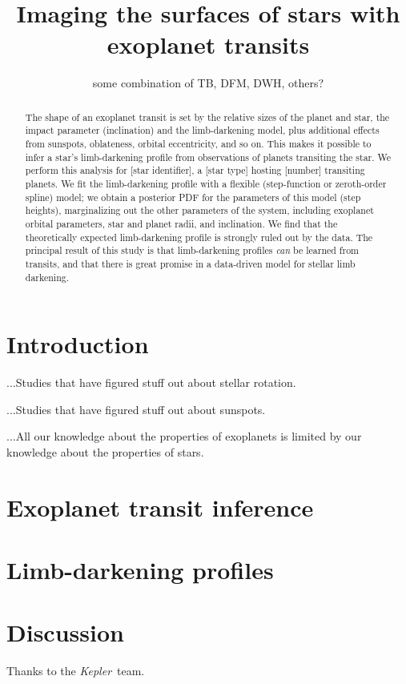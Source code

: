 \documentclass[12pt,letterpaper,preprint]{aastex}
\newcommand{\Kepler}{\textsl{Kepler}}
\begin{document}
\title{Imaging the surfaces of stars with exoplanet transits}
\author{some combination of TB, DFM, DWH, others?}

\begin{abstract}
The shape of an exoplanet transit is set by the relative sizes of the planet and
star, the impact parameter (inclination) and the limb-darkening model, plus
additional effects from sunspots, oblateness, orbital eccentricity, and so on.
%
This makes it possible to infer a star's limb-darkening profile from
observations of planets transiting the star.
%
We perform this analysis for [star identifier], a [star type] hosting [number]
transiting planets.
%
We fit the limb-darkening profile with a flexible (step-function or zeroth-order
spline) model; we obtain a posterior PDF for the parameters of this model (step
heights), marginalizing out the other parameters of the system, including
exoplanet orbital parameters, star and planet radii, and inclination.
%
We find that the theoretically expected limb-darkening profile is strongly ruled
out by the data.
%
The principal result of this study is that limb-darkening profiles \emph{can} be
learned from transits, and that there is great promise in a data-driven model
for stellar limb darkening.
\end{abstract}


\section{Introduction}

...Studies that have figured stuff out about stellar rotation.

...Studies that have figured stuff out about sunspots.

...All our knowledge about the properties of exoplanets is limited by our
knowledge about the properties of stars.

\section{Exoplanet transit inference}

\section{Limb-darkening profiles}

\section{Discussion}

\acknowledgements
Thanks to the \Kepler\ team.
\end{document}
